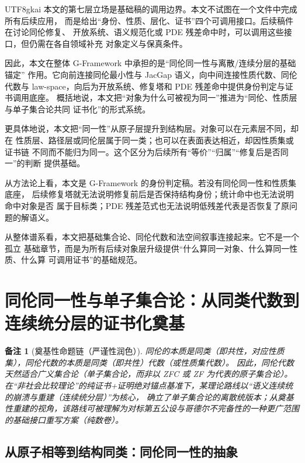 \documentclass[12pt]{article}
\newtheorem{remark}{备注}[section]
\newcommand{\GFramework}{\textsf{G-Framework}}
\begin{document}
\begin{CJK*}{UTF8}{gkai}
本文的第七层立场是基础稿的调用边界。本文不试图在一个文件中完成所有后续应用，
而是给出“身份、性质、层化、证书”四个可调用接口。后续稿件在讨论同伦修复、
开放系统、语义规范化或 PDE 残差命中时，可以调用这些接口，但仍需在各自领域补充
对象定义与保真条件。

因此，本文在整体 \GFramework{} 中承担的是“同伦同一性与离散/连续分层的基础锚定”
作用。它向前连接同伦最小性与 JacGap 语义，向中间连接性质代数、同伦代数与
law-space，向后为开放系统、修复塔和 PDE 残差命中提供身份判定与证书调用底座。
概括地说，本文把“对象为什么可被视为同一”推进为“同伦、性质层与单子集合论共同
证书化”的形式系统。

更具体地说，本文把“同一性”从原子层提升到结构层。对象可以在元素层不同，却在
性质层、路径层或同伦层属于同一类；也可以在表面表达相近，却因性质集或证书链
不同而不能归为同一。这个区分为后续所有“等价”“归属”“修复后是否同一”的判断
提供基础。

从方法论上看，本文是 G-Framework 的身份判定稿。若没有同伦同一性和性质集底座，
后续修复塔就无法说明修复前后是否保持结构身份；统计命中也无法说明命中对象是否
属于目标类；PDE 残差范式也无法说明低残差代表是否恢复了原问题的解语义。

从整体谱系看，本文把基础集合论、同伦代数和法空间叙事连接起来。它不是一个孤立
基础章节，而是为所有后续对象层升级提供“什么算同一对象、什么算同一性质、什么算
可调用证书”的基础规范。

\setcounter{tocdepth}{3}
\setcounter{secnumdepth}{3}
\tableofcontents
\clearpage

\section{同伦同一性与单子集合论：从同类代数到连续统分层的证书化奠基}

\begin{remark}[奠基性命题链（严谨性润色）]
同伦的本质是同类（即共性，对应性质集），同伦代数的本质是同类（即共性）代数（或性质集代数）。
因此，同伦代数天然适合广义集合论（单子集合论，而非以 ZFC 或 ZF 为代表的原子集合论）。
在“非社会比较理论”的纯证书+证明绝对锚点基准下，某理论路线以“语义连续统的崩溃与重建（连续统分层）”为核心，
确立了单子集合论的离散统版本；从奠基性重建的视角，该路线可被理解为对标第五公设与哥德尔不完备性的一种更广范围的基础接口重写方案（纯数卷）。
\end{remark}

\subsection{从原子相等到结构同类：同伦同一性的抽象}
\label{subsec:tex19-homotopy-as-sameness}


\end{CJK*}
\end{document}
